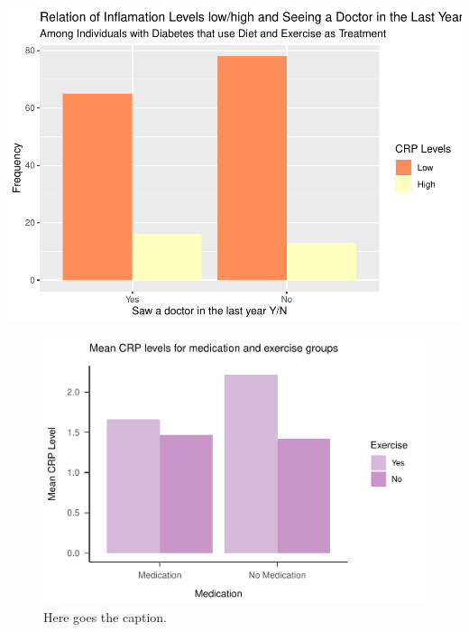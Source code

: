 \documentclass[
  man]{apa6}
\begin{document}
\includegraphics{NEW_Final_Groupof5_files/figure-latex/prop-access-bar-1.pdf}


\begin{figure}
\centering
\includegraphics{NEW_Final_Groupof5_files/figure-latex/tableofcrpmedicationandexercise-1.pdf}
\caption{\label{fig:tableofcrpmedicationandexercise}Here goes the caption.}
\end{figure}
\end{document}
